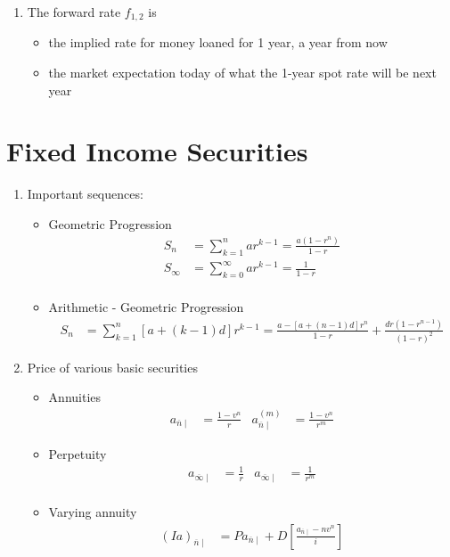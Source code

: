 \documentclass[12pt,twoside]{article}
\begin{document}
\begin{enumerate}
\item The forward rate $f_{1,2}$ is 
\begin{itemize}
\item the implied rate for money loaned for 1 year, a year from now
\item the market expectation today of what the 1-year spot rate will be next year
\end{itemize}

\end{enumerate}




\section {Fixed Income Securities}
\begin{enumerate}
	\item Important sequences:
		\begin{itemize}
			\item Geometric Progression
				\begin{align*}
					S_n &= \sum_{k=1}^n ar^{k-1}  =\frac{a(1-r^n)}{1-r}\\
					S_\infty &= \sum_{k=0}^\infty ar^{k-1} = \frac{1}{1-r}\\
				\end{align*}
			\item Arithmetic - Geometric Progression
				\begin{align*}
					S_n & = \sum_{k=1}^n\left[a + (k-1)d\right]r^{k-1}= \frac{a-\left[a+(n-1)d\right]r^n}{1-r}+\frac{dr(1-r^{n-1})}{(1-r)^2}
				\end{align*}
			\end{itemize}
	
	\item Price of various basic securities
		\begin{itemize}
			\item Annuities
				\begin{align*}
					a_{\overline{n}\mid} & = \frac{1-v^n}{r} &
					a_{\overline{n}\mid}^{(m)} & = \frac{1-v^n}{r^{m}}
				\end{align*}
			\item Perpetuity
				\begin{align*}
					a_{\overline{\infty}\mid} & = \frac{1}{r}&
					a_{\overline{\infty}\mid} & = \frac{1}{r^{m}}\\
				\end{align*}
				
			\item  Varying annuity
				\begin{align*}
					(Ia)_{\overline{n}\mid} & = Pa_{\overline{n}\mid} + D\left[\frac{a_{\overline{n}\mid} - nv^n}{i}\right]
				\end{align*}
				

\end{itemize}
\end{enumerate}
\end{document}
